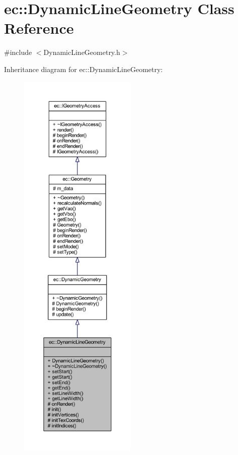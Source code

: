 \hypertarget{classec_1_1_dynamic_line_geometry}{}\section{ec\+:\+:Dynamic\+Line\+Geometry Class Reference}
\label{classec_1_1_dynamic_line_geometry}


{\ttfamily \#include $<$Dynamic\+Line\+Geometry.\+h$>$}



Inheritance diagram for ec\+:\+:Dynamic\+Line\+Geometry\+:\nopagebreak
\begin{figure}[H]
\begin{center}
\leavevmode
\includegraphics[height=550pt]{classec_1_1_dynamic_line_geometry__inherit__graph}
\end{center}
\end{figure}


